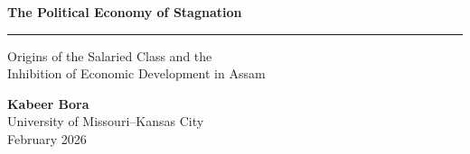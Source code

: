 \documentclass[aspectratio=169, 10pt]{beamer}
\begin{document}
\begin{frame}[plain]

\vspace{1.5cm}
\hspace{60pt}\begin{minipage}{0.78\textwidth}
  {\fontsize{24}{28}\selectfont\color{ink}\textbf{The Political Economy of Stagnation}}
  
  \vspace{12pt}
  {\color{clay}\rule{50pt}{2.5pt}}
  
  \vspace{12pt}
  {\large\color{slate} Origins of the Salaried Class and the\\ Inhibition of Economic Development in Assam}
  
  \vspace{28pt}
  {\color{ink}\textbf{Kabeer Bora}}\\[4pt]
  {\color{slate}University of Missouri--Kansas City}\\[2pt]
  {\color{slate}\small February 2026}
\end{minipage}
\end{frame}
\end{document}
